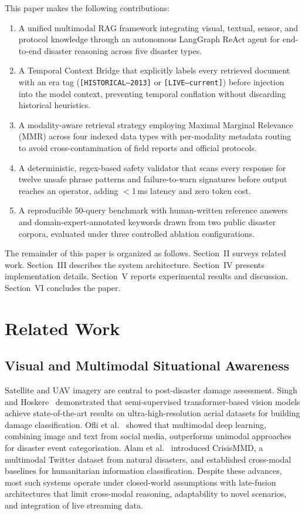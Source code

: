 \documentclass[conference]{IEEEtran}
\begin{document}
This paper makes the following contributions:
\begin{enumerate}
  \item A unified multimodal RAG framework integrating visual, textual, sensor,
        and protocol knowledge through an autonomous LangGraph ReAct agent for
        end-to-end disaster reasoning across five disaster types.
  \item A Temporal Context Bridge that explicitly labels every retrieved
        document with an era tag (\texttt{[HISTORICAL--2013]} or
        \texttt{[LIVE--current]}) before injection into the model context,
        preventing temporal conflation without discarding historical heuristics.
  \item A modality-aware retrieval strategy employing Maximal Marginal
        Relevance (MMR) across four indexed data types with per-modality
        metadata routing to avoid cross-contamination of field reports and
        official protocols.
  \item A deterministic, regex-based safety validator that scans every response
        for twelve unsafe phrase patterns and failure-to-warn signatures before
        output reaches an operator, adding $<$1\,ms latency and zero token cost.
  \item A reproducible 50-query benchmark with human-written reference answers
        and domain-expert-annotated keywords drawn from two public disaster
        corpora, evaluated under three controlled ablation configurations.
\end{enumerate}

The remainder of this paper is organized as follows. Section~II surveys related
work. Section~III describes the system architecture. Section~IV presents
implementation details. Section~V reports experimental results and discussion.
Section~VI concludes the paper.

\section{Related Work}

\subsection{Visual and Multimodal Situational Awareness}

Satellite and UAV imagery are central to post-disaster damage assessment.
Singh and Hoskere~\cite{b15} demonstrated that semi-supervised transformer-based
vision models achieve state-of-the-art results on ultra-high-resolution aerial
datasets for building damage classification. Ofli et al.~\cite{b16} showed that
multimodal deep learning, combining image and text from social media, outperforms
unimodal approaches for disaster event categorisation. Alam et al.~\cite{b4}
introduced CrisisMMD, a multimodal Twitter dataset from natural disasters, and
established cross-modal baselines for humanitarian information classification.
Despite these advances, most such systems operate under closed-world assumptions
with late-fusion architectures that limit cross-modal reasoning, adaptability to
novel scenarios, and integration of live streaming data.
\end{document}
